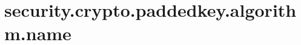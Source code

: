 \section{security.crypto.paddedkey.algorithm.name}
\label{configuration:SecurityCryptoPaddedkeyAlgorithmName}
\AvailableInJavaOnly{\TODO}